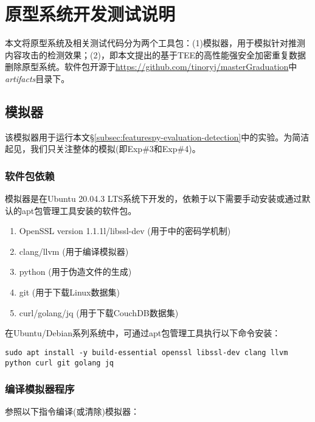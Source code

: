 \chapter{原型系统开发测试说明}
\label{chapter:appendix}

本文将原型系统及相关测试代码分为两个工具包：(1)\sysnameF 模拟器，用于模拟针对推测内容攻击的检测效果；(2)\prototype ，即本文提出的基于TEE的高性能强安全加密重复数据删除原型系统。软件包开源于\url{https://github.com/tinoryj/masterGraduation}中{\em artifacts}目录下。



\section{\sysnameF 模拟器}
\label{sec:appendix-simulator}
该模拟器用于运行本文\S\ref{subsec:featurespy-evaluation-detection}中的实验。为简洁起见，我们只关注整体\sysnameF 的模拟(即Exp\#3和Exp\#4)。

\subsection*{软件包依赖}

\sysnameF 模拟器是在Ubuntu 20.04.3 LTS系统下开发的，依赖于以下需要手动安装或通过默认的apt包管理工具安装的软件包。

\begin{enumerate}[leftmargin=0em]
  \item OpenSSL version 1.1.1l/libssl-dev (用于\sysnameF 中的密码学机制)
  \item clang/llvm (用于编译模拟器)
  \item python (用于伪造文件的生成)
  \item git (用于下载Linux数据集)
  \item curl/golang/jq (用于下载CouchDB数据集)
\end{enumerate}

在Ubuntu/Debian系列系统中，可通过apt包管理工具执行以下命令安装：

\begin{lstlisting}[style=shell]
sudo apt install -y build-essential openssl libssl-dev clang llvm python curl git golang jq
\end{lstlisting}

\subsection*{编译模拟器程序}

参照以下指令编译(或清除)\sysnameF 模拟器：

